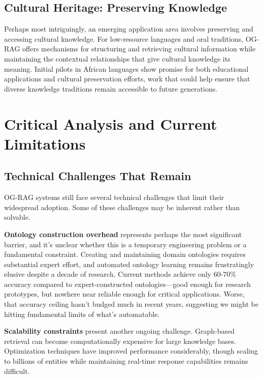 \subsection{Cultural Heritage: Preserving Knowledge}

Perhaps most intriguingly, an emerging application area involves preserving and accessing cultural knowledge. For low-resource languages and oral traditions, OG-RAG offers mechanisms for structuring and retrieving cultural information while maintaining the contextual relationships that give cultural knowledge its meaning. Initial pilots in African languages show promise for both educational applications and cultural preservation efforts, work that could help ensure that diverse knowledge traditions remain accessible to future generations.

\section{Critical Analysis and Current Limitations}

\subsection{Technical Challenges That Remain}

OG-RAG systems still face several technical challenges that limit their widespread adoption. Some of these challenges may be inherent rather than solvable.

\textbf{Ontology construction overhead} represents perhaps the most significant barrier, and it's unclear whether this is a temporary engineering problem or a fundamental constraint. Creating and maintaining domain ontologies requires substantial expert effort, and automated ontology learning remains frustratingly elusive despite a decade of research. Current methods achieve only 60-70\% accuracy compared to expert-constructed ontologies—good enough for research prototypes, but nowhere near reliable enough for critical applications. Worse, that accuracy ceiling hasn't budged much in recent years, suggesting we might be hitting fundamental limits of what's automatable.

\textbf{Scalability constraints} present another ongoing challenge. Graph-based retrieval can become computationally expensive for large knowledge bases. Optimization techniques have improved performance considerably, though scaling to billions of entities while maintaining real-time response capabilities remains difficult.

